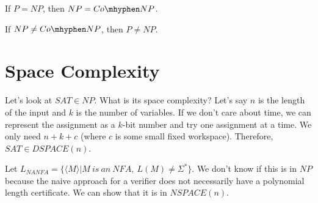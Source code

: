 \documentclass[twoside]{article}
\begin{document}
If $P=NP$, then $NP = Co\mhyphen NP$.

If $NP\neq Co\mhyphen NP$, then $P\neq NP$.


\section*{Space Complexity}




Let's look at $SAT\in NP$.  What is its space complexity?  Let's say $n$ is the length of the input and $k$ is the number of variables.  If we don't care about time, we can represent the assignment as a $k$-bit number and try one assignment at a time.  We only need $n+k+c$ (where $c$ is some small fixed workspace).  Therefore, $SAT\in DSPACE(n)$.

Let $L_{NANFA} = \{ \langle M \rangle | M \ is \ an \ NFA, \ L(M)\neq \Sigma^* \}$.  We don't know if this is in $NP$ because the naive approach for a verifier does not necessarily have a polynomial length certificate.  We can show that it is in $NSPACE(n)$.
\end{document}

